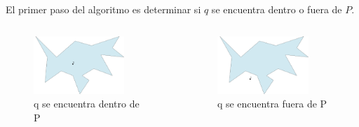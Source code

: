 \documentclass[aspectratio=169,xcolor=dvipsnames, t]{beamer}
\begin{document}
\begin{frame}
    \vspace{0.5cm}
    El primer paso del algoritmo es determinar si $q$ se encuentra dentro o fuera de $P$.\\
    \begin{columns}
      \begin{column}{0.45\textwidth}
        \begin{figure}
          \centering
          \includegraphics[width=0.8\textwidth]{imagenes/Caso001.png}
          \caption{q se encuentra dentro de P}
        \end{figure}
      \end{column}
      \begin{column}{0.45\textwidth}  %
        \begin{figure}
          \centering
          \includegraphics[width=0.8\textwidth]{imagenes/Caso002.png}
          \caption{q se encuentra fuera de P}
        \end{figure}
      \end{column}
    \end{columns}
\end{frame}
\end{document}
